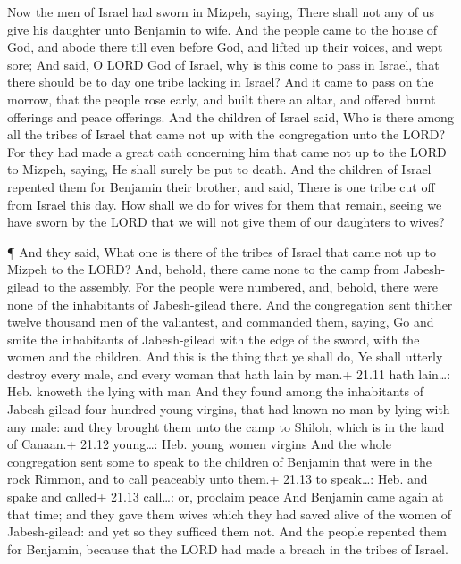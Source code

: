  Now the men of Israel had sworn in Mizpeh, saying, There
shall not any of us give his daughter unto Benjamin to wife.
 And the people came to the house of God, and abode there
till even before God, and lifted up their voices, and wept sore;
 And said, O LORD God of Israel, why is this come to pass in
Israel, that there should be to day one tribe lacking in Israel?
 And it came to pass on the morrow, that the people rose
early, and built there an altar, and offered burnt offerings and peace
offerings.  And the children of Israel said, Who is there
among all the tribes of Israel that came not up with the congregation
unto the LORD? For they had made a great oath concerning him that came
not up to the LORD to Mizpeh, saying, He shall surely be put to death.
 And the children of Israel repented them for Benjamin their
brother, and said, There is one tribe cut off from Israel this day.
 How shall we do for wives for them that remain, seeing we
have sworn by the LORD that we will not give them of our daughters to
wives?

 ¶ And they said, What one is there of the tribes of Israel
that came not up to Mizpeh to the LORD? And, behold, there came none to
the camp from Jabesh-gilead to the assembly.  For the people
were numbered, and, behold, there were none of the inhabitants of
Jabesh-gilead there.  And the congregation sent thither
twelve thousand men of the valiantest, and commanded them, saying, Go
and smite the inhabitants of Jabesh-gilead with the edge of the sword,
with the women and the children.  And this is the thing
that ye shall do, Ye shall utterly destroy every male, and every woman
that hath lain by man.+ 21.11 hath lain\ldots: Heb. knoweth the lying
with man  And they found among the inhabitants of
Jabesh-gilead four hundred young virgins, that had known no man by lying
with any male: and they brought them unto the camp to Shiloh, which is
in the land of Canaan.+ 21.12 young\ldots: Heb. young women virgins
 And the whole congregation sent some to speak to the
children of Benjamin that were in the rock Rimmon, and to call peaceably
unto them.+ 21.13 to speak\ldots: Heb. and spake and called+ 21.13
call\ldots: or, proclaim peace  And Benjamin came again at
that time; and they gave them wives which they had saved alive of the
women of Jabesh-gilead: and yet so they sufficed them not. 
And the people repented them for Benjamin, because that the LORD had
made a breach in the tribes of Israel.

